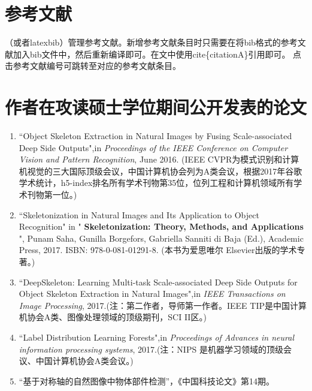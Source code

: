 \documentclass[UTF8]{ctexart}
\numberwithin{equation}{section} %
\numberwithin{table}{section} %
\begin{document}
\section{参考文献}
（或者latexbib）管理参考文献。新增参考文献条目时只需要在将bib格式的参考文献加入bib文件中，然后重新编译即可。在文中使用cite\{citationA\}引用即可。
点击参考文献编号\cite{shen2017deepskeleton}可跳转至对应的参考文献条目。

\pagebreak
{} %



\pagebreak
{} %
\section*{作者在攻读硕士学位期间公开发表的论文}
\begin{enumerate}
\item “Object Skeleton Extraction in Natural Images by Fusing Scale-associated Deep Side Outputs",in \emph{Proceedings of the IEEE Conference on Computer Vision and Pattern Recognition}, June 2016.
(IEEE CVPR为模式识别和计算机视觉的三大国际顶级会议，中国计算机协会列为A类会议，根据2017年谷歌学术统计，h5-index排名所有学术刊物第35位，位列工程和计算机领域所有学术刊物第一位。)

\item “Skeletonization in Natural Images and Its Application to Object Recognition" in "\textbf{ Skeletonization: Theory, Methods, and Applications }", Punam Saha, Gunilla Borgefors, Gabriella Sanniti di Baja (Ed.), 
Academic Press, 2017. ISBN: 978-0-081-01291-8. (本书为爱思唯尔 Elsevier出版的学术专著。)

\item “DeepSkeleton: Learning Multi-task Scale-associated Deep Side Outputs for Object Skeleton Extraction in Natural Images",in \emph{IEEE Transactions on Image Processing}, 2017.(注：第二作者，导师第一作者。IEEE TIP是中国计算机协会A类、图像处理领域的顶级期刊，SCI II区。)

\item “Label Distribution Learning Forests",in \emph{Proceedings of Advances in neural information processing systems}, 2017.(注：NIPS 是机器学习领域的顶级会议、中国计算机协会A类会议。)

\item “基于对称轴的自然图像中物体部件检测”，《中国科技论文》第14期。

\end{enumerate}
\end{document}

